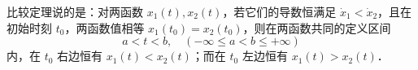 
比较定理说的是：对两函数 $x_1(t),x_2(t)$，若它们的导数恒满足 $\dot x_1<\dot x_2$，且在初始时刻 $t_0$，两函数值相等 $x_1(t_0)=x_2(t_0)$，则在两函数共同的定义区间 
\begin{equation}
a<t<b,\quad(-\infty\leq a<b\leq+\infty)
\end{equation}
内，在 $t_0$ 右边恒有 $x_1(t)<x_2(t)$；而在 $t_0$ 左边恒有 $x_1(t)>x_2(t)$．
